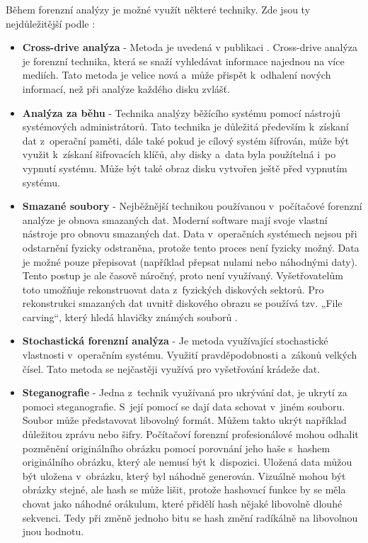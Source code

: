 \documentclass[thesis=B,czech]{FITthesis}[2012/06/26]
\begin{document}
Během forenzní analýzy je možné využít některé techniky. Zde jsou ty nejdůležitější podle \cite{for_w}:
\begin{itemize}
\item \textbf{Cross-drive analýza} - Metoda je uvedená v publikaci \cite{garfinkel2006forensic}. Cross-drive analýza je forenzní technika, která se snaží vyhledávat informace najednou na více mediích. Tato metoda je velice nová a~může přispět k~odhalení nových informací, než při analýze každého disku zvlášť.

\item \textbf{Analýza za běhu} - Technika analýzy běžícího systému pomocí nástrojů systémových administrátorů. Tato technika je důležitá především k~získaní dat z~operační paměti, dále také pokud je cílový systém šífrován, může být využit k~získaní šifrovacích klíčů, aby disky a~data byla použítelná i~po vypnutí systému. Může být také obraz disku vytvořen ještě před vypnutím systému.

\item \textbf{Smazané soubory} - Nejběžnější technikou používanou v~počítačové forenzní analýze je obnova smazaných dat. Moderní software mají svoje vlastní nástroje pro obnovu smazaných dat. Data v~operačních systémech nejsou při odstarnění fyzicky odstraněna, protože tento proces není fyzicky možný. Data je možné pouze přepisovat (například přepsat nulami nebo náhodnými daty). Tento postup je ale časově náročný,  proto není využívaný. Vyšetřovatelům toto umožňuje rekonstruovat data z~fyzických diskových sektorů. Pro rekonstrukci smazaných dat uvnitř diskového obrazu se používá tzv. „File carving“, který hledá hlavičky známých souborů \cite{for_w}. 

\item \textbf{Stochastická forenzní analýza} - Je metoda využívající stochastické vlastnosti v~operačním systému. Využití pravděpodobnosti a~zákonů velkých čísel. Tato metoda se nejčastěji využívá pro vyšetřování krádeže dat.

\item \textbf{Steganografie} - Jedna z~technik využívaná pro ukrývání dat, je ukrytí za pomoci steganografie. S~její pomocí se dají data schovat v~jiném souboru. Soubor může představovat libovolný formát. Můžem takto ukrýt například důležitou zprávu nebo šifry. Počítačoví forenzní profesionálové mohou odhalit pozměnění originálního obrázku pomocí porovnání jeho haše s~hashem originálního obrázku, který ale nemusí být k~dispozici. Uložená data můžou být uložena v~obrázku, který byl náhodně generován. Vizuálně mohou být obrázky stejné, ale hash se může lišit, protože hashovací funkce by se měla chovat jako náhodné orákulum, které přidělí hash nějaké libovolně dlouhé sekvenci. Tedy při změně jednoho bitu se hash změní radíkálně na libovolnou jnou hodnotu.
\end{itemize}
\end{document}
